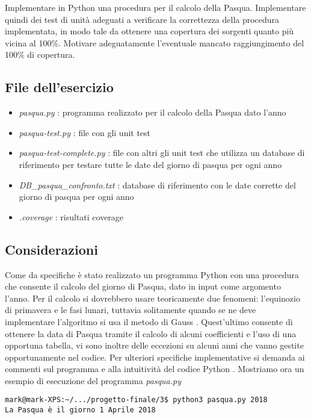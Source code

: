 \documentclass{article}
\newcommand{\py}{Python }
\newcommand{\filename}[1]{\textit{#1}}
\begin{document}
\begin{consegna}
Implementare in \py una procedura per il calcolo della Pasqua.
Implementare quindi dei test di unità adeguati a verificare la correttezza della procedura implementata, in modo tale da ottenere una copertura dei sorgenti quanto più vicina al 100\%. Motivare adeguatamente l’eventuale mancato raggiungimento del 100\% di copertura.
\end{consegna}

\subsection{File dell'esercizio}
\begin{itemize}
    \item \filename{pasqua.py} : programma realizzato per il calcolo della Pasqua dato l'anno
    \item \filename{pasqua-test.py} : file con gli unit test
    \item \filename{pasqua-test-complete.py} : file con altri gli unit test che utilizza un database di riferimento per testare tutte le date del giorno di pasqua per ogni anno
    \item \filename{DB\_pasqua\_confronto.txt} : database di riferimento con le date corrette del giorno di pasqua per ogni anno
    \item \filename{.coverage} : risultati coverage
\end{itemize}

\subsection{Considerazioni}
Come da specifiche è stato realizzato un programma \py con una procedura che consente il calcolo del giorno di Pasqua, dato in input come argomento l'anno. Per il calcolo si dovrebbero usare teoricamente due fenomeni: l'equinozio di primavera e le fasi lunari, tuttavia solitamente quando se ne deve implementare l'algoritmo si usa il metodo di Gauss \cite{pasqua1} \cite{pasqua2}. Quest'ultimo consente di ottenere la data di Pasqua tramite il calcolo di alcuni coefficienti e l'uso di una opportuna tabella, vi sono inoltre delle eccezioni su alcuni anni che vanno gestite opportunamente nel codice. Per ulteriori specifiche implementative si demanda ai commenti sul programma e alla intuitività del codice \py.
Mostriamo ora un esempio di esecuzione del programma \filename{pasqua.py}
\begin{verbatim}
mark@mark-XPS:~/.../progetto-finale/3$ python3 pasqua.py 2018
La Pasqua è il giorno 1 Aprile 2018
\end{verbatim}
\end{document}
